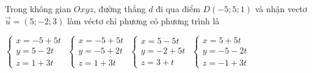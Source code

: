 \documentclass[12pt,a4paper]{article}
\begin{document}
\begin{ex}
 Trong không gian ${Oxyz}$, đường thẳng ${d}$ đi qua điểm ${D(-5;5;1)}$ và nhận vectơ $\vec{u}=(5;-2;3)$ làm véctơ chỉ phương có phương trình là
 
\choice
{ \True $\left\{ \begin{array}{l}x = -5+5t\\ y = 5-2t\\z = 1+3t\end{array} \right.$ }
   { $\left\{ \begin{array}{l}x = -5+5t\\ y = -5+2t\\z = 1+3t\end{array} \right.$ }
     { $\left\{ \begin{array}{l}x = 5-5t\\ y = -2+5t\\z = 3+t\end{array} \right.$ }
    { $\left\{ \begin{array}{l}x = 5+5t\\ y = -5-2t\\z = -1+3t\end{array} \right.$ }
\end{ex}
\end{document}
